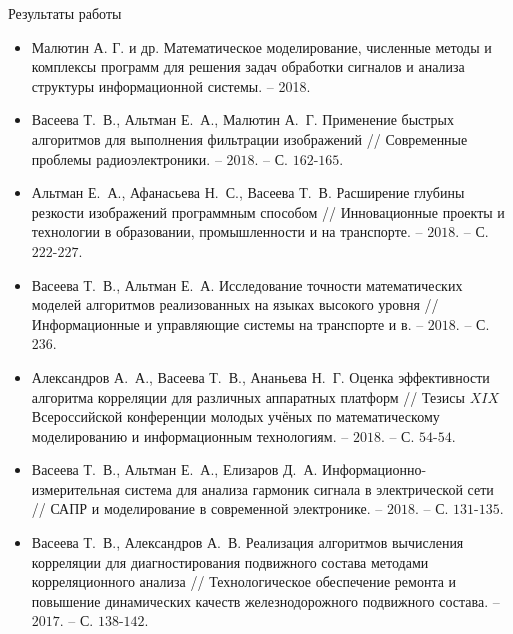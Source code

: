 \begin{frame}{Результаты работы}
\scriptsize{
\begin{itemize}
	\item Малютин А. Г. и др. Математическое моделирование, численные методы и комплексы программ для решения задач обработки сигналов и анализа структуры информационной системы. – 2018.
	
	\item Васеева Т.~В., Альтман Е.~А., Малютин А.~Г. Применение быстрых алгоритмов для выполнения фильтрации изображений // Современные проблемы радиоэлектроники. – $2018$. – С. $162$-$165$.
	
	\item Альтман Е.~А., Афанасьева Н.~С., Васеева Т.~В. Расширение глубины резкости изображений программным способом // Инновационные проекты и технологии в образовании, промышленности и на транспорте. – $2018$. – С. $222$-$227$.
	
	\item Васеева Т.~В., Альтман Е.~А. Исследование точности математических моделей алгоритмов реализованных на языках высокого уровня // Информационные и управляющие системы на транспорте и в. – $2018$. – С. $236$.
	
	\item Александров А.~А., Васеева Т.~В., Ананьева Н.~Г. Оценка эффективности алгоритма корреляции для различных аппаратных платформ // Тезисы $XIX$ Всероссийской конференции молодых учёных по математическому моделированию и информационным технологиям. – $2018$. – С. $54$-$54$.
	
	\item Васеева Т.~В., Альтман Е.~А., Елизаров Д.~А. Информационно-измерительная система для анализа гармоник сигнала в электрической сети // САПР и моделирование в современной электронике. – $2018$. – С. $131$-$135$.
	
	\item Васеева Т.~В., Александров А.~В. Реализация алгоритмов вычисления корреляции для диагностирования подвижного состава методами корреляционного анализа // Технологическое обеспечение ремонта и повышение динамических качеств железнодорожного подвижного состава. – $2017$. – С. $138$-$142$.
\end{itemize}}
\end{frame}

